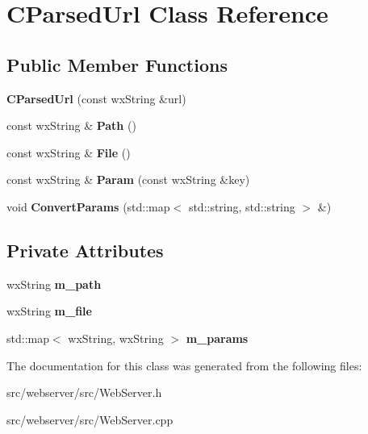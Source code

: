 \section{CParsedUrl Class Reference}
\label{classCParsedUrl}
\subsection*{Public Member Functions}
\begin{DoxyCompactItemize}
\item 
{\bfseries CParsedUrl} (const wxString \&url)\label{classCParsedUrl_a5d92be668962906375919274849b2281}

\item 
const wxString \& {\bfseries Path} ()\label{classCParsedUrl_aa13acc3bfe41b309efe2dc2b776a73e2}

\item 
const wxString \& {\bfseries File} ()\label{classCParsedUrl_a1f7a00e6d5af2993dbe42b57f98884de}

\item 
const wxString \& {\bfseries Param} (const wxString \&key)\label{classCParsedUrl_a52df0e76531e14d507afed16dc0a2879}

\item 
void {\bfseries ConvertParams} (std::map$<$ std::string, std::string $>$ \&)\label{classCParsedUrl_aa6b1a9f3da1e216dda4eb4dbadbc2814}

\end{DoxyCompactItemize}
\subsection*{Private Attributes}
\begin{DoxyCompactItemize}
\item 
wxString {\bfseries m\_\-path}\label{classCParsedUrl_a9cc9f86fef8cfa82f086b9b5524b1284}

\item 
wxString {\bfseries m\_\-file}\label{classCParsedUrl_a3eaba3682b8faeb02160587e3d89ac09}

\item 
std::map$<$ wxString, wxString $>$ {\bfseries m\_\-params}\label{classCParsedUrl_af376288b7d79f24d8080da5a9a640691}

\end{DoxyCompactItemize}


The documentation for this class was generated from the following files:\begin{DoxyCompactItemize}
\item 
src/webserver/src/WebServer.h\item 
src/webserver/src/WebServer.cpp\end{DoxyCompactItemize}
